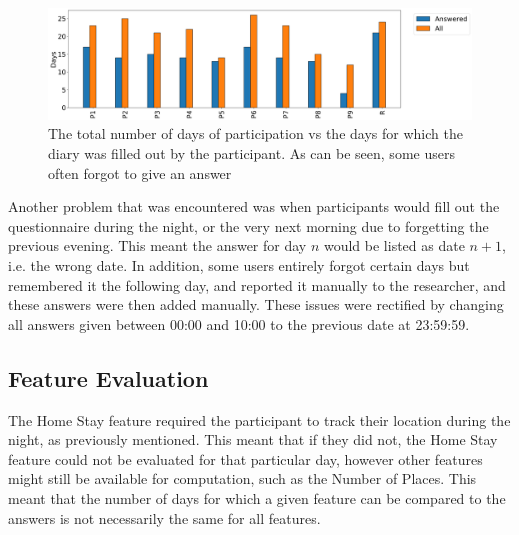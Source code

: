\begin{figure}[h]
    \centering
    \includegraphics[width=\textwidth]{images/study/storage/answers_days_plot.png}
    \caption{The total number of days of participation vs the days for which the diary was filled out by the participant. As can be seen, some users often forgot to give an answer}
    \label{fig:plot-days-answered}
\end{figure}

Another problem that was encountered was when participants would fill out the questionnaire during the night, or the very next morning due to forgetting the previous evening. This meant the answer for day $n$ would be listed as date $n+1$, i.e. the wrong date.  In addition, some users entirely forgot certain days but remembered it the following day, and reported it manually to the researcher, and these answers were then added manually. These issues were rectified by changing all answers given between 00:00 and 10:00 to the previous date at 23:59:59.

\subsection{Feature Evaluation}
The Home Stay feature required the participant to track their location during the night, as previously mentioned. This meant that if they did not, the Home Stay feature could not be evaluated for that particular day, however other features might still be available for computation, such as the Number of Places. This meant that the number of days for which a given feature can be compared to the answers is not necessarily the same for all features. \\

